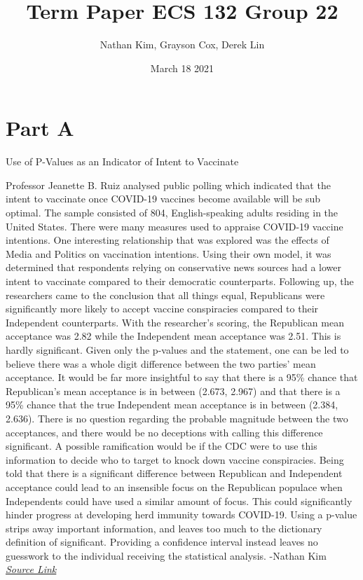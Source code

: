 \documentclass{article}
\title{Term Paper ECS 132 Group 22}
\author{Nathan Kim, Grayson Cox, Derek Lin }
\date{March 18 2021}
\begin{document}
\maketitle



\section{Part A}
    
    \centerline{Use of P-Values as an Indicator of Intent to Vaccinate} 
	\indent Professor Jeanette B. Ruiz analysed public polling which indicated that the intent to vaccinate once COVID-19 vaccines become available will be sub optimal. The sample consisted of 804, English-speaking adults residing in the United States. There were many measures used to appraise COVID-19 vaccine intentions. One interesting relationship that was explored was the effects of Media and Politics on vaccination intentions. Using their own model, it was determined that respondents relying on conservative news sources had a lower intent to vaccinate compared to their democratic counterparts. Following up, the researchers came to the conclusion that all things equal, Republicans were significantly more likely to accept vaccine conspiracies compared to their Independent counterparts. With the researcher’s scoring, the Republican mean acceptance was 2.82 while the Independent mean acceptance was 2.51. This is hardly significant. Given only the p-values and the statement, one can be led to believe there was a whole digit difference between the two parties’ mean acceptance. It would be far more insightful to say that there is a 95\% chance that Republican’s mean acceptance is in between (2.673, 2.967) and that there is a 95\% chance that the true Independent mean acceptance is in between (2.384, 2.636). There is no question regarding the probable magnitude between the two acceptances, and there would be no deceptions with calling this difference significant. A possible ramification would be if the CDC were to use this information to decide who to target to knock down vaccine conspiracies. Being told that there is a significant difference between Republican and Independent acceptance could lead to an insensible focus on the Republican populace when Independents could have used a similar amount of focus. This could significantly hinder progress at developing herd immunity towards COVID-19. Using a p-value strips away important information, and leaves too much to the dictionary definition of significant. Providing a confidence interval instead leaves no guesswork to the individual receiving the statistical analysis.
    -Nathan Kim
    \\
    \href{https://www.ncbi.nlm.nih.gov/pmc/articles/PMC7794597/?fbclid=IwAR24aHyyKyUiKOV1kRIFDTCrim32KTttaLupR1Hhz3U7cvR2dwUcAOa3es0}{\textit{Source Link}}
\end{document}
